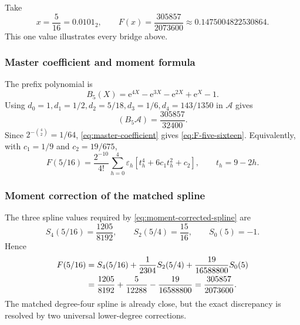 \documentclass[11pt,oneside]{article}
\theoremstyle{definition}
\theoremstyle{remark}
\newcommand{\e}{\mathrm e}
\newcommand{\tm}{\varepsilon}
\begin{document}
Take
\[
 x=\frac5{16}=0.0101_2,
 \qquad
 F(x)=\frac{305857}{2073600}
 \approx0.1475004822530864.                                \label{eq:F-five-sixteen}
\]
This one value illustrates every bridge above.

\subsubsection{Master coefficient and moment formula}

The prefix polynomial is
\begin{equation}
 B_5(X)=\e^{4X}-\e^{3X}-\e^{2X}+\e^X-1.                  \label{eq:B5}
\end{equation}
Using
\(
 d_0=1,d_1=1/2,d_2=5/18,d_3=1/6,d_4=143/1350
\)
in $\mathscr A$ gives
\begin{equation}
 [X^4](B_5\mathscr A)=\frac{305857}{32400}.               \label{eq:B5-coefficient}
\end{equation}
Since $2^{-\binom42}=1/64$, \eqref{eq:master-coefficient} gives
\eqref{eq:F-five-sixteen}.  Equivalently, with
$c_1=1/9$ and $c_2=19/675$,
\begin{equation}
 F(5/16)=\frac{2^{-10}}{4!}
 \sum_{h=0}^{4}\tm_h
 \left[t_h^4+6c_1t_h^2+c_2\right],
 \qquad t_h=9-2h.                                         \label{eq:five-sixteen-moment}
\end{equation}

\subsubsection{Moment correction of the matched spline}

The three spline values required by \eqref{eq:moment-corrected-spline} are
\begin{equation}
 S_4(5/16)=\frac{1205}{8192},
 \qquad
 S_2(5/4)=\frac{15}{16},
 \qquad
 S_0(5)=-1.                                                \label{eq:five-sixteen-splines}
\end{equation}
Hence
\begin{align}
 F(5/16)
 &=S_4(5/16)+\frac1{2304}S_2(5/4)
   +\frac{19}{16588800}S_0(5)                             \notag\\
 &=\frac{1205}{8192}+\frac5{12288}-\frac{19}{16588800}
 =\frac{305857}{2073600}.                                 \label{eq:five-sixteen-correction}
\end{align}
The matched degree-four spline is already close, but the exact discrepancy is resolved by two
universal lower-degree corrections.
\end{document}
